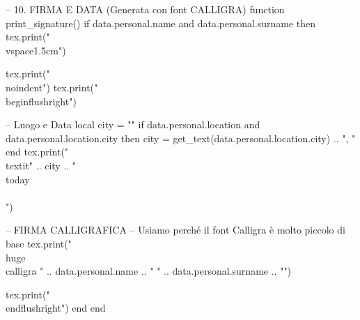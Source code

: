 \begin{luacode*}
    -- 10. FIRMA E DATA (Generata con font CALLIGRA)
    function print_signature()
    if data.personal.name and data.personal.surname then
    tex.print("\\vspace{1.5cm}")

    tex.print("\\noindent")
    tex.print("\\begin{flushright}")

        -- Luogo e Data
        local city = ""
        if data.personal.location and data.personal.location.city then
        city = get_text(data.personal.location.city) .. ", "
        end
        tex.print("\\textit{" .. city .. "\\today} \\\\[0.5em]")

        -- FIRMA CALLIGRAFICA
        -- Usiamo \huge perché il font Calligra è molto piccolo di base
        tex.print("{\\huge\\calligra " .. data.personal.name .. " " .. data.personal.surname .. "}")

        tex.print("\\end{flushright}")
    end
    end


\end{luacode*}

\newcommand{\loadPersonalData}{\directlua{load_personal_data()}}
\newcommand{\printWorkExperience}{\directlua{print_work()}}
\newcommand{\printResearchActivities}{\directlua{print_research()}}
\newcommand{\printEducation}{\directlua{print_education()}}
\newcommand{\printPublications}{\directlua{print_publications()}}
\newcommand{\printSkills}{\directlua{print_skills()}}
\newcommand{\printLanguages}{\directlua{print_languages()}}
\newcommand{\printProjects}{\directlua{print_projects()}}
\newcommand{\printGDPR}{\directlua{print_gdpr()}}
\newcommand{\printSignature}{\directlua{print_signature()}}